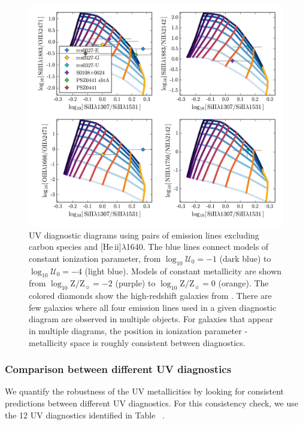 \documentclass[preprint2]{aastex62}
\newcommand{\heii}{[He\,{\sc ii}]\xspace}
\newcommand{\logten}{\ensuremath{\log_{10}}}
\newcommand{\logZeq}[1]{\ensuremath{\logten \mathrm{Z}/\mathrm{Z}_{\sun} = #1}}
\newcommand{\logUeq}[1]{\ensuremath{\logten \mathcal{U}_0 = #1}}
\newcommand{\XXX}{{\bf \color{red}{XXX} }}
\begin{document}
\begin{figure}
  \begin{center}
    \includegraphics[width=\linewidth]{figs/f5.png}
    \caption{UV diagnostic diagrams using pairs of emission lines excluding carbon species and \heii$\lambda$1640.  The blue lines connect models of constant ionization parameter, from \logUeq{-1} (dark blue) to \logUeq{-4} (light blue). Models of constant metallicity are shown from \logZeq{-2} (purple) to \logZeq{0} (orange). The colored diamonds show the high-redshift galaxies from \citet{Rigby+2018b}. There are few galaxies where all four emission lines used in a given diagnostic diagram are observed in multiple objects. For galaxies that appear in multiple diagrams, the position in ionization parameter - metallicity space is roughly consistent between diagnostics.}
    \label{fig:UVSiO}
  \end{center}
\end{figure}

\subsubsection{Comparison between different UV diagnostics}\label{sec:UVOpt:UV}

We quantify the robustness of the UV metallicities by looking for consistent predictions between different UV diagnostics. For this consistency check, we use the 12 UV diagnostics identified in Table~\XXX.
\end{document}
